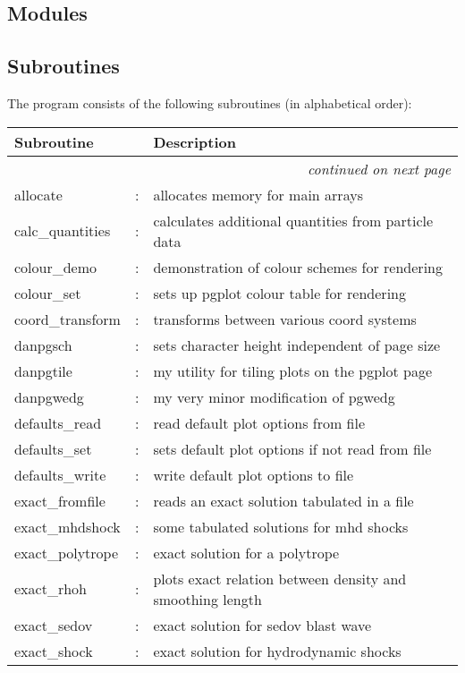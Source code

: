 \documentclass[a4paper,12pt]{article}
\begin{document}
\subsection{Modules}

\subsection{Subroutines}
The program consists of the following subroutines (in alphabetical order):
\begin{longtable}{|lcp{}|}
\hline
Subroutine &  & Description \\
\hline \endhead
\multicolumn{3}{|r|}{\emph{continued on next page}} \\
\hline \endfoot
\hline \endlastfoot
allocate           & : & allocates memory for main arrays \\
calc\_quantities    & : & calculates additional quantities from particle data\\
colour\_demo        & : & demonstration of colour schemes for rendering\\
colour\_set	 & : & sets up pgplot colour table for rendering\\
coord\_transform    & : & transforms between various coord systems\\
danpgsch           & : & sets character height independent of page size\\
danpgtile          & : & my utility for tiling plots on the pgplot page\\
danpgwedg          & : & my very minor modification of pgwedg\\
defaults\_read	 & : & read default plot options from file\\
defaults\_set	 & : & sets default plot options if not read from file\\
defaults\_write	 & : & write default plot options to file\\
exact\_fromfile     & : & reads an exact solution tabulated in a file\\
exact\_mhdshock     & : & some tabulated solutions for mhd shocks \\
exact\_polytrope    & : & exact solution for a polytrope\\
exact\_rhoh	 & : & plots exact relation between density and smoothing length\\
exact\_sedov        & : & exact solution for sedov blast wave\\
exact\_shock        & : & exact solution for hydrodynamic shocks\\

\end{longtable}
\end{document}
